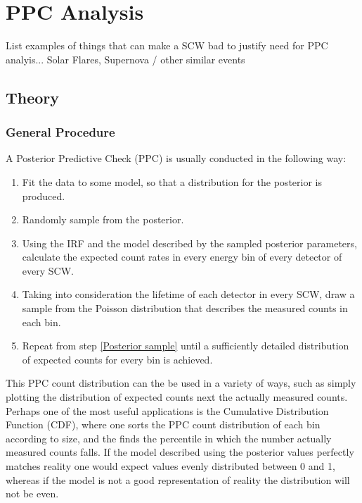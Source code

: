 \documentclass{article}
\begin{document}
\section{PPC Analysis}

List examples of things that can make a SCW bad to justify need for PPC analyis...
Solar Flares,
Supernova / other similar events 

\subsection{Theory}

\subsubsection{General Procedure} \label{PPC general}

A Posterior Predictive Check (PPC) is usually conducted in the following way:

\begin{enumerate}
    \item Fit the data to some model, so that a distribution for the posterior is produced.
    \item \label{Posterior sample} Randomly sample from the posterior.
    \item \label{ppc calc count rates} Using the IRF and the model described by the sampled posterior parameters, calculate the expected count rates in every energy bin of every detector of every SCW.
    \item \label{ppc poisson sample} Taking into consideration the lifetime of each detector in every SCW, draw a sample from the Poisson distribution that describes the measured counts in each bin.
    \item Repeat from step \ref{Posterior sample} until a sufficiently detailed distribution of expected counts for every bin is achieved.
\end{enumerate}

This PPC count distribution can the be used in a variety of ways, such as simply plotting the distribution of expected counts next the actually measured counts. Perhaps one of the most useful applications is the Cumulative Distribution Function (CDF), where one sorts the PPC count distribution of each bin according to size, and the finds the percentile in which the number actually measured counts falls. If the model described using the posterior values perfectly matches reality one would expect values evenly distributed between 0 and 1, whereas if the model is not a good representation of reality the distribution will not be even. 
\end{document}
